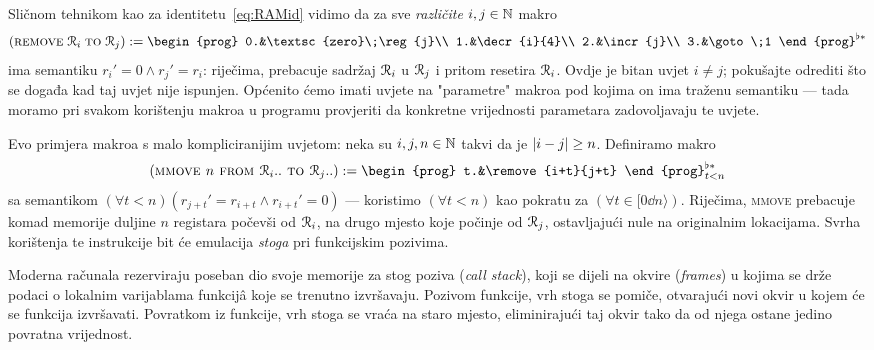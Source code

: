 \noindent
Sličnom tehnikom kao za identitetu~\eqref{eq:RAMid} vidimo da za sve \emph{različite} $i,j\in{\mathbb N}$ makro
\begin{equation}
    (\remove{i}{j}):=\begin{prog}
    0.&\textsc{zero}\;\reg{j}\\
    1.&\decr{i}{4}\\
    2.&\incr{j}\\
    3.&\goto\;1
    \end{prog}^{\flat*}
\end{equation}
ima semantiku $r_i'=0\land r_j'=r_i$: riječima, prebacuje sadržaj $\mathcal R_{i}$ u $\mathcal R_{j}$ i pritom resetira $\mathcal R_{i}$. Ovdje je bitan uvjet $i\ne j$; pokušajte odrediti što se događa kad taj uvjet nije ispunjen. Općenito ćemo imati uvjete na "parametre" makroa pod kojima on ima traženu semantiku --- tada moramo pri svakom korištenju makroa u programu provjeriti da konkretne vrijednosti parametara zadovoljavaju te uvjete.

Evo primjera makroa s malo kompliciranijim uvjetom: neka su $i,j,n\in{\mathbb N}$ takvi da je $\lvert i-j\rvert\ge n$. Definiramo makro
\begin{equation}
    (\textsc{mmove $n$ from $\reg{i}..$ to $\reg{j}..$}):=\begin{prog}
    t.&\remove{i+t}{j+t}
    \end{prog}_{t<n}^{\flat*}
\end{equation}
sa semantikom $(\forall t<n)(r_{j+t}'=r_{i+t}\land r_{i+t}'=0)$ --- koristimo $(\forall t<n)$ kao pokratu za $(\forall t\in[0\dd n\rangle)$. Riječima, \textsc{mmove} prebacuje komad memorije duljine $n$ registara počevši od $\mathcal R_{i}$, na drugo mjesto koje počinje od $\mathcal R_{j}$, ostavljajući nule na originalnim lokacijama. Svrha korištenja te instrukcije bit će emulacija \emph{stoga} pri funkcijskim pozivima.

Moderna računala rezerviraju poseban dio svoje memorije za stog poziva (\emph{call stack}), koji se dijeli na okvire (\emph{frames}) u kojima se drže podaci o lokalnim varijablama funkcijâ koje se trenutno izvršavaju. Pozivom funkcije, vrh stoga se pomiče, otvarajući novi okvir u kojem će se funkcija izvršavati. Povratkom iz funkcije, vrh stoga se vraća na staro mjesto, eliminirajući taj okvir tako da od njega ostane jedino povratna vrijednost.

